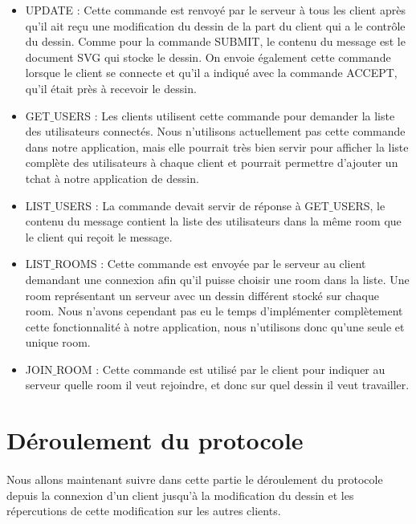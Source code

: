 \documentclass[a4paper,10pt]{article}
\begin{document}
\begin{itemize}
\item UPDATE : Cette commande est renvoyé par le serveur à tous les client après qu'il ait reçu une modification du dessin de la part du client qui a le contrôle du dessin. Comme pour la commande SUBMIT, le contenu du message est le document SVG qui stocke le dessin.
On envoie également cette commande lorsque le client se connecte et qu'il a indiqué avec la commande ACCEPT, qu'il était près à recevoir le dessin.

\item GET$\_$USERS : Les clients utilisent cette commande pour demander la liste des utilisateurs connectés. Nous n'utilisons actuellement pas cette commande dans notre application, mais elle pourrait très bien servir pour afficher la liste complète des utilisateurs à chaque client et pourrait permettre d'ajouter un tchat à notre application de dessin.

\item LIST$\_$USERS : La commande devait servir de réponse à GET$\_$USERS, le contenu du message contient la liste des utilisateurs dans la même room que le client qui reçoit le message.

\item LIST$\_$ROOMS : Cette commande est envoyée par le serveur au client demandant une connexion afin qu'il puisse choisir une room dans la liste. Une room représentant un serveur avec un dessin différent stocké sur chaque room.
Nous n'avons cependant pas eu le temps d'implémenter complètement cette fonctionnalité à notre application, nous n'utilisons donc qu'une seule et unique room.

\item JOIN$\_$ROOM : Cette commande est utilisé par le client pour indiquer au serveur quelle room il veut rejoindre, et donc sur quel dessin il veut travailler.
\end{itemize}

\section{Déroulement du protocole}
\paragraph{}Nous allons maintenant suivre dans cette partie le déroulement du protocole depuis la connexion d'un client jusqu'à la modification du dessin et les répercutions de cette modification sur les autres clients.
\end{document}
